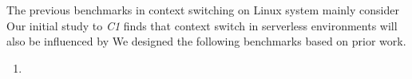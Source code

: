 	The previous benchmarks in context switching on Linux system mainly consider %
	Our initial study to \emph{C1} finds that context switch in serverless environments will also be influenced by %
	We designed the following benchmarks based on prior work.
	\begin{enumerate}
		\item 
	\end{enumerate}


